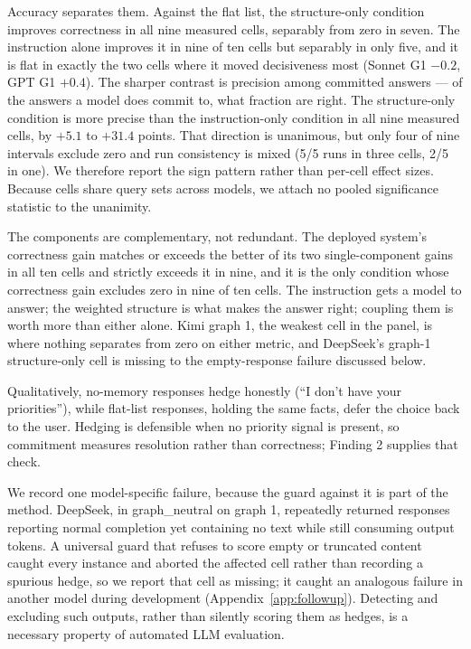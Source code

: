 \documentclass[11pt]{article}
\begin{document}
Accuracy separates them. Against the flat list, the structure-only condition improves correctness in all nine measured cells, separably from zero in seven. The instruction alone improves it in nine of ten cells but separably in only five, and it is flat in exactly the two cells where it moved decisiveness most (Sonnet G1 $-0.2$, GPT G1 $+0.4$). The sharper contrast is precision among committed answers --- of the answers a model does commit to, what fraction are right. The structure-only condition is more precise than the instruction-only condition in all nine measured cells, by $+5.1$ to $+31.4$ points. That direction is unanimous, but only four of nine intervals exclude zero and run consistency is mixed (5/5 runs in three cells, 2/5 in one). We therefore report the sign pattern rather than per-cell effect sizes. Because cells share query sets across models, we attach no pooled significance statistic to the unanimity.

The components are complementary, not redundant. The deployed system's correctness gain matches or exceeds the better of its two single-component gains in all ten cells and strictly exceeds it in nine, and it is the only condition whose correctness gain excludes zero in nine of ten cells. The instruction gets a model to answer; the weighted structure is what makes the answer right; coupling them is worth more than either alone. Kimi graph 1, the weakest cell in the panel, is where nothing separates from zero on either metric, and DeepSeek's graph-1 structure-only cell is missing to the empty-response failure discussed below.

Qualitatively, no-memory responses hedge honestly (``I don't have your priorities''), while flat-list responses, holding the same facts, defer the choice back to the user. Hedging is defensible when no priority signal is present, so commitment measures resolution rather than correctness; Finding 2 supplies that check.

We record one model-specific failure, because the guard against it is part of the method. DeepSeek, in graph\_neutral on graph 1, repeatedly returned responses reporting normal completion yet containing no text while still consuming output tokens. A universal guard that refuses to score empty or truncated content caught every instance and aborted the affected cell rather than recording a spurious hedge, so we report that cell as missing; it caught an analogous failure in another model during development (Appendix~\ref{app:followup}). Detecting and excluding such outputs, rather than silently scoring them as hedges, is a necessary property of automated LLM evaluation.
\end{document}
